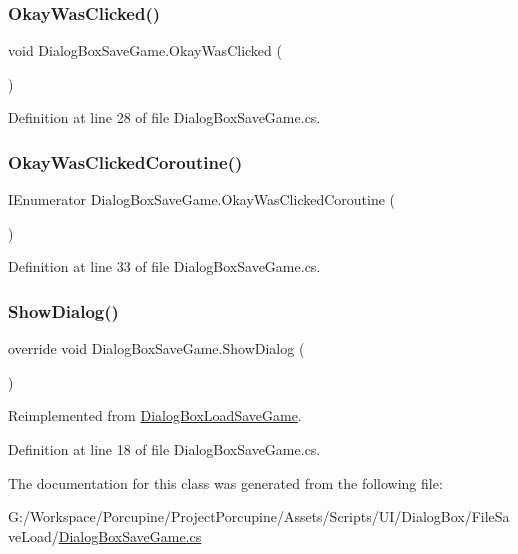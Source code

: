 \subsubsection{\texorpdfstring{Okay\+Was\+Clicked()}{OkayWasClicked()}}
{\footnotesize\ttfamily void Dialog\+Box\+Save\+Game.\+Okay\+Was\+Clicked (\begin{DoxyParamCaption}{ }\end{DoxyParamCaption})}



Definition at line 28 of file Dialog\+Box\+Save\+Game.\+cs.

\mbox{\label{class_dialog_box_save_game_a60b4df4890e0db361d5a01200b3824de}} 
\subsubsection{\texorpdfstring{Okay\+Was\+Clicked\+Coroutine()}{OkayWasClickedCoroutine()}}
{\footnotesize\ttfamily I\+Enumerator Dialog\+Box\+Save\+Game.\+Okay\+Was\+Clicked\+Coroutine (\begin{DoxyParamCaption}{ }\end{DoxyParamCaption})}



Definition at line 33 of file Dialog\+Box\+Save\+Game.\+cs.

\mbox{\label{class_dialog_box_save_game_a83ed557d75cb749de3b8e3a6b60e1c3d}} 
\subsubsection{\texorpdfstring{Show\+Dialog()}{ShowDialog()}}
{\footnotesize\ttfamily override void Dialog\+Box\+Save\+Game.\+Show\+Dialog (\begin{DoxyParamCaption}{ }\end{DoxyParamCaption})\hspace{0.3cm}{\ttfamily [virtual]}}



Reimplemented from \hyperlink{class_dialog_box_load_save_game_ae44957b0dcc55696639d534c04574c57}{Dialog\+Box\+Load\+Save\+Game}.



Definition at line 18 of file Dialog\+Box\+Save\+Game.\+cs.



The documentation for this class was generated from the following file\+:\begin{DoxyCompactItemize}
\item 
G\+:/\+Workspace/\+Porcupine/\+Project\+Porcupine/\+Assets/\+Scripts/\+U\+I/\+Dialog\+Box/\+File\+Save\+Load/\hyperlink{_dialog_box_save_game_8cs}{Dialog\+Box\+Save\+Game.\+cs}\end{DoxyCompactItemize}
